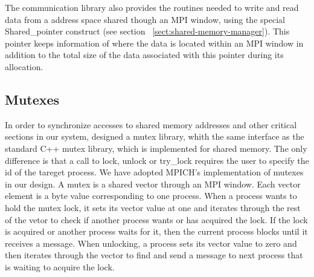 The communication library also provides the routines needed to write and read data from a address space shared
though an MPI window, using the special Shared\_pointer construct (see section ~\ref{sect:shared-memory-manager}).  
This pointer keeps information of where the data is located within an MPI window in addition to the total size of the data associated with this pointer during its allocation. 

\subsection{Mutexes}
In order to synchronize accesses to shared memory addresses and other critical sections in our system, designed
a mutex library, whith the same interface as the standard C++ mutex library, which is implemented
for shared memory.  The only difference is that a call to lock, unlock or try\_lock requires the user to specify
the id of the tareget process. We have adopted MPICH's implementation of mutexes in our design.  A mutex is a
shared vector through an MPI window.  Each vector element is a byte value corresponding to one process.  When
a process wants to hold the mutex lock, it sets its vector value at one and iterates through the rest of the 
vetor to check if another process wants or has acquired the lock.  If the lock is acquired or another process 
waits for it, then the current process blocks until it receives a message.  When unlocking, a process sets its 
vector value to zero and then iterates through the vector to find and send a message to next process that is 
waiting to acquire the lock.  


